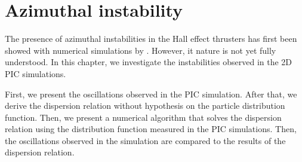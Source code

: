 



\chapter{Azimuthal instability}
\label{ch-3}

The presence of azimuthal instabilities in the Hall effect thrusters has first been showed with numerical simulations by \citet{adam2004}.
However, it nature is not yet fully understood.
In this chapter, we investigate the instabilities observed in the \ac{2D} \ac{PIC} simulations.

First, we present the oscillations observed in the PIC simulation.
After that, we derive the dispersion relation without hypothesis on the particle distribution function.
Then, we present a numerical algorithm that solves the dispersion relation using the distribution function measured in the \ac{PIC} simulations.
Then, the oscillations observed in the simulation are compared to the results of the dispersion relation.

% 
% 

\minitoc






